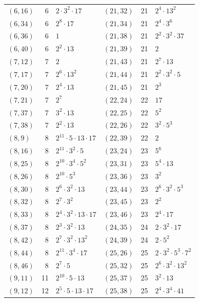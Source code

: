\documentclass[11pt]{article}
\begin{document}
\begin{longtable}{@{}lrl@{\qquad}lrl@{}}
$(6,16)$ & 6 & $2\cdot 3^{2}\cdot 17$ & $(21,32)$ & 21 & $2^{4}\cdot 13^{2}$\\
$(6,34)$ & 6 & $2^{8}\cdot 17$ & $(21,34)$ & 21 & $2^{4}\cdot 3^{6}$\\
$(6,36)$ & 6 & $1$ & $(21,38)$ & 21 & $2^{2}\cdot 3^{2}\cdot 37$\\
$(6,40)$ & 6 & $2^{2}\cdot 13$ & $(21,39)$ & 21 & $2$\\
$(7,12)$ & 7 & $2$ & $(21,43)$ & 21 & $2^{7}\cdot 13$\\
$(7,17)$ & 7 & $2^{6}\cdot 13^{2}$ & $(21,44)$ & 21 & $2^{2}\cdot 3^{2}\cdot 5$\\
$(7,20)$ & 7 & $2^{4}\cdot 13$ & $(21,45)$ & 21 & $2^{3}$\\
$(7,21)$ & 7 & $2^{7}$ & $(22,24)$ & 22 & $17$\\
$(7,37)$ & 7 & $3^{2}\cdot 13$ & $(22,25)$ & 22 & $5^{2}$\\
$(7,38)$ & 7 & $2^{2}\cdot 13$ & $(22,26)$ & 22 & $3^{2}\cdot 5^{3}$\\
$(8,9)$ & 8 & $2^{11}\cdot 5\cdot 13\cdot 17$ & $(22,39)$ & 22 & $2$\\
$(8,16)$ & 8 & $2^{11}\cdot 3^{2}\cdot 5$ & $(23,24)$ & 23 & $5^{6}$\\
$(8,25)$ & 8 & $2^{10}\cdot 3^{4}\cdot 5^{2}$ & $(23,31)$ & 23 & $5^{4}\cdot 13$\\
$(8,26)$ & 8 & $2^{10}\cdot 5^{3}$ & $(23,36)$ & 23 & $3^{2}$\\
$(8,30)$ & 8 & $2^{6}\cdot 3^{2}\cdot 13$ & $(23,44)$ & 23 & $2^{6}\cdot 3^{2}\cdot 5^{3}$\\
$(8,32)$ & 8 & $2^{7}\cdot 3^{2}$ & $(23,45)$ & 23 & $2^{2}$\\
$(8,33)$ & 8 & $2^{4}\cdot 3^{2}\cdot 13\cdot 17$ & $(23,46)$ & 23 & $2^{4}\cdot 17$\\
$(8,37)$ & 8 & $2^{3}\cdot 3^{2}\cdot 13$ & $(24,35)$ & 24 & $2\cdot 3^{2}\cdot 17$\\
$(8,42)$ & 8 & $2^{7}\cdot 3^{2}\cdot 13^{2}$ & $(24,39)$ & 24 & $2\cdot 5^{2}$\\
$(8,44)$ & 8 & $2^{11}\cdot 3^{4}\cdot 17$ & $(25,26)$ & 25 & $2\cdot 3^{2}\cdot 5^{3}\cdot 7^{2}$\\
$(8,46)$ & 8 & $2^{7}\cdot 5$ & $(25,32)$ & 25 & $2^{6}\cdot 3^{2}\cdot 13^{2}$\\
$(9,11)$ & 11 & $2^{10}\cdot 5\cdot 13$ & $(25,37)$ & 25 & $3^{2}\cdot 13$\\
$(9,12)$ & 12 & $2^{5}\cdot 5\cdot 13\cdot 17$ & $(25,38)$ & 25 & $2^{4}\cdot 3^{4}\cdot 41$\\

\end{longtable}
\end{document}
